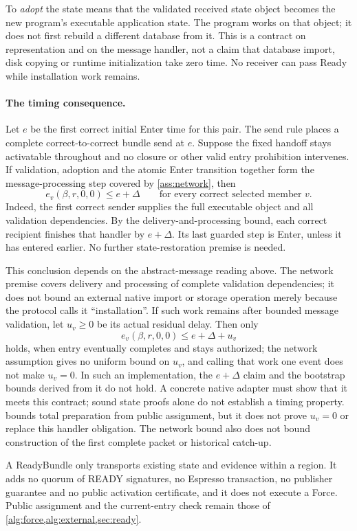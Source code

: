 \documentclass[11pt,a4paper]{article}
\newcounter{protocol}
\begin{document}
To \emph{adopt} the state means that the validated received state object
becomes the new program's executable application state. The program works
on that object; it does not first rebuild a different database from it.
This is a contract on representation and on the message handler, not a
claim that database import, disk copying or runtime initialization take
zero time. No receiver can pass Ready while installation work remains.

\paragraph{The timing consequence.}
Let $e$ be the first correct initial Enter time for this pair. The send
rule places a complete correct-to-correct bundle send at $e$. Suppose the
fixed handoff stays activatable throughout and no closure or other valid
entry prohibition intervenes. If validation, adoption and the atomic
Enter transition together form the message-processing step covered by
\cref{ass:network}, then
\[
 e_v(\beta,r,0,0)\le e+\Delta
 \qquad\text{for every correct selected member }v.
\]
Indeed, the first correct sender supplies the full executable object and
all validation dependencies. By the delivery-and-processing bound, each
correct recipient finishes that handler by $e+\Delta$. Its last guarded
step is Enter, unless it has entered earlier. No further
state-restoration premise is needed.

This conclusion depends on the abstract-message reading above. The
network premise covers delivery and processing of complete validation
dependencies; it does not bound an external native import or storage
operation merely because the protocol calls it ``installation''. If such
work remains after bounded message validation, let $u_v\ge0$ be its
actual residual delay. Then only
\[
 e_v(\beta,r,0,0)\le e+\Delta+u_v
\]
holds, when entry eventually completes and stays authorized; the network
assumption gives no uniform bound on $u_v$, and calling that work one
event does not make $u_v=0$. In such an implementation, the $e+\Delta$
claim and the bootstrap bounds derived from it do not hold. A concrete
native adapter must show that it meets this contract; sound state proofs
alone do not establish a timing property.  bounds
total preparation from public assignment, but it does not prove $u_v=0$
or replace this handler obligation. The network bound also does not
bound construction of the first complete packet or historical catch-up.

A ReadyBundle only transports existing state and evidence within a
region. It adds no quorum of READY signatures, no Espresso transaction,
no publisher guarantee and no public activation certificate, and it does
not execute a Force. Public assignment and the current-entry check remain
those of \cref{alg:force,alg:external,sec:ready}.
\end{document}
